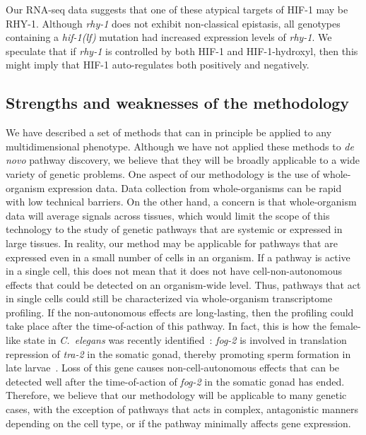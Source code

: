 \documentclass[9pt,twocolumn,twoside]{pnas-new}
\newcommand{\cel}{\emph{C.~elegans}}
\newcommand{\gene}[1]{\mbox{\emph{#1}}}
\newcommand{\hif}{\gene{hif-1(lf)}}
\newcommand{\rhyp}{RHY-1}
\newcommand{\hifp}{HIF-1}
\begin{document}
Our RNA-seq data suggests that one of these atypical targets of \hifp{} may be
\rhyp{}. Although \gene{rhy-1} does not exhibit non-classical epistasis, all
genotypes containing a \hif{} mutation had increased expression levels of
\gene{rhy-1}. We speculate that if \gene{rhy-1} is controlled by both \hifp{}
and \hifp{}-hydroxyl, then this might imply that \hifp{} auto-regulates both
positively and negatively.

\subsection*{Strengths and weaknesses of the methodology}
We have described a set of methods that can in principle be applied to
any multidimensional phenotype. Although we have not applied these methods to
\emph{de novo} pathway discovery, we believe that they will be broadly
applicable to a wide variety of genetic problems. One aspect of our methodology
is the use of whole-organism expression data. Data collection from
whole-organisms can be rapid with low technical barriers. On the other
hand, a concern is that whole-organism data will average signals across tissues,
which would limit the scope of this technology to the study of genetic pathways
that are systemic or expressed in large tissues. In
reality, our method may be applicable for pathways that are expressed even in a
small number of cells in an organism. If a pathway is active in a single cell,
this does not mean that it does not have cell-non-autonomous effects that could
be detected on an organism-wide level. Thus,
pathways that act in single cells could still be
characterized via whole-organism transcriptome profiling. If the non-autonomous
effects are long-lasting, then the profiling could take place after the
time-of-action of this pathway. In fact, this is how the female-like state in
\cel{} was recently identified~\cite{Angeles-Albores2017a}: \gene{fog-2} is
involved in translation repression of \gene{tra-2} in the somatic gonad,
thereby promoting sperm formation in late larvae~\cite{Clifford2000}.
Loss of this gene causes non-cell-autonomous effects that can be detected well
after the time-of-action of \gene{fog-2} in the somatic gonad has ended.
Therefore, we believe that our methodology will be applicable to many
genetic cases, with the exception of pathways that
acts in complex, antagonistic manners depending on the cell type, or if
the pathway minimally affects gene expression.
\end{document}
